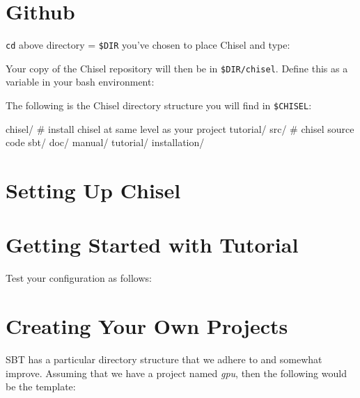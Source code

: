\documentclass[twocolumn, 10pt]{article}
\begin{document}
\section{Github}

\verb+cd+ above directory = \verb+$DIR+ you've chosen to place Chisel and type:


\noindent
Your copy of the Chisel repository will then be in \verb+$DIR/chisel+.  Define this as a variable in your bash environment:


The following is the Chisel directory structure you will find in \verb+$CHISEL+:

\begin{bash}
chisel/      # install chisel at same level as your project
  tutorial/      
  src/       # chisel source code 
  sbt/
  doc/
    manual/
    tutorial/
    installation/
\end{bash}

\section{Setting Up Chisel}

\section{Getting Started with Tutorial}

Test your configuration as follows:


% 

\section{Creating Your Own Projects}

SBT has a particular directory structure that we adhere to and
somewhat improve.  Assuming that we have a project named {\em gpu},
then the following would be the template:
\end{document}
